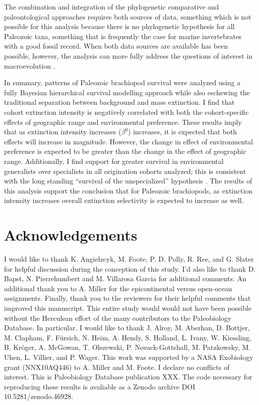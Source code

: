 \documentclass{article}
\begin{document}
The combination and integration of the phylogenetic comparative and paleontological approaches requires both sources of data, something which is not possible for this analysis because there is no phylogenetic hypothesis for all Paleozoic taxa, something that is frequently the case for marine invertebrates with a good fossil record. When both data sources are available has been possible, however, the analysis can more fully address the questions of interest in macroevolution \citep{Smits2015,Slater2013a,Slater2015b,Simpson2011,Tomiya2013,Slater2012,Raia2013c,Raia2012f,Harnik2014,Fritz2013a}.

In summary, patterns of Paleozoic brachiopod survival were analyzed using a fully Bayesian hierarchical survival modelling approach while also eschewing the traditional separation between background and mass extinction. I find that cohort extinction intensity is negatively correlated with both the cohort-specific effects of geographic range and environmental preference. These results imply that as extinction intensity increases (\(\beta^{0}\)) increases, it is expected that both effects will increase in magnitude. However, the change in effect of environmental preference is expected to be greater than the change in the effect of geographic range. Additionally, I find support for greater survival in environmental generalists over specialists in all origination cohorts analyzed; this is consistent with the long standing ``survival of the unspecialized'' hypothesis \citep{Liow2004a,Liow2007b,Simpson1944,Simpson1953,Smits2015,Nurnberg2015,Nurnberg2013a, Baumiller1993}. The results of this analysis support the conclusion that for Paleozoic brachiopods, as extinction intensity increases overall extinction selectivity is expected to increase as well.


\section*{Acknowledgements}
I would like to thank K. Angielzcyk, M. Foote, P. D. Polly, R. Ree, and G. Slater for helpful discussion during the conception of this study. I'd also like to thank D. Bapst, N. Pierrehumbert and M. Villarosa Garcia for additional comments. An additional thank you to  A. Miller for the epicontinental versus open-ocean assignments. Finally, thank you to the reviewers for their helpful comments that improved this manuscript. This entire study would would not have been possible without the Herculean effort of the many contributors to the Paleobiology Database. In particular, I would like to thank J. Alroy, M. Aberhan, D. Bottjer, M. Clapham, F. F\"{u}rsich, N. Heim, A. Hendy, S. Holland, L. Ivany, W. Kiessling, B. Kr\"{o}ger, A. McGowan, T. Olszewski, P. Novack-Gottshall, M. Patzkowsky, M. Uhen, L. Villier, and P. Wager. This work was supported by a NASA Exobiology grant (NNX10AQ446) to A. Miller and M. Foote. I declare no conflicts of interest. This is Paleobiology Database publication XXX. The code necessary for reproducing these results is avaliable as a Zenodo archive DOI 10.5281/zenodo.46928.
\end{document}
